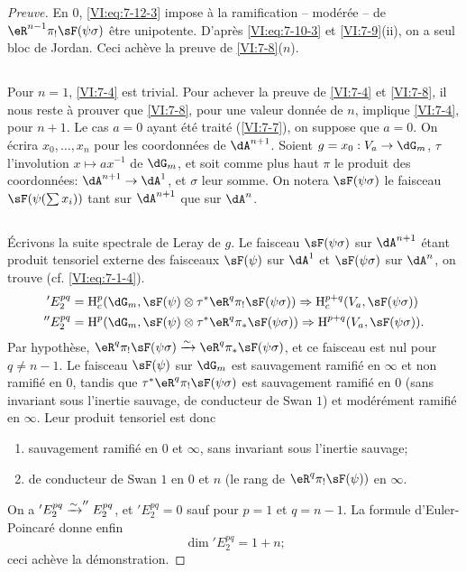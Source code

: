 \begin{proof}[Preuve]
En $0$, \eqref{VI:eq:7-12-3} impose à la ramification -- modérée -- de 
$\eR^{n-1} \pi_! \sF(\psi\sigma)$ être unipotente. D'après 
\eqref{VI:eq:7-10-3} et \ref{VI:7-9}(ii), on a seul bloc de Jordan. Ceci 
achève la preuve de \ref{VI:7-8}($n$). 





\subsection{}\label{VI:7-13}

Pour $n=1$, \ref{VI:7-4} est trivial. Pour achever la preuve de \ref{VI:7-4} et 
\ref{VI:7-8}, il nous reste à prouver que \ref{VI:7-8}, pour une valeur 
donnée de $n$, implique \ref{VI:7-4}, pour $n+1$. Le cas $a=0$ ayant été 
traité (\ref{VI:7-7}), on suppose que $a=0$. On écrira $x_0,\dots,x_n$ pour 
les coordonnées de $\dA^{n+1}$. Soient $g=x_0:V_a\to \dG_m$, $\tau$ 
l'involution $x\mapsto a x^{-1}$ de $\dG_m$, et soit comme plus haut $\pi$ le 
produit des coordonnées: $\dA^{n+1} \to \dA^1$, et $\sigma$ leur somme. On 
notera $\sF(\psi\sigma)$ le faisceau $\sF(\psi(\sum x_i))$ tant sur $\dA^{n+1}$ 
que sur $\dA^n$. 





\subsection{}\label{VI:7-14}

Écrivons la suite spectrale de Leray de $g$. Le faisceau $\sF(\psi\sigma)$ sur 
$\dA^{n+1}$ étant produit tensoriel externe des faisceaux $\sF(\psi)$ sur 
$\dA^1$ et $\sF(\psi\sigma)$ sur $\dA^n$, on trouve (cf. \eqref{VI:eq:7-1-4}). 
\begin{align*}
  'E_2^{p q} &= \h_c^p(\dG_m,\sF(\psi)\otimes \tau^\ast \eR^q \pi_! \sF(\psi\sigma)) \Rightarrow \h_c^{p+q}(V_a,\sF(\psi\sigma)) \\
  ''E_2^{p q} &= \h^p(\dG_m,\sF(\psi)\otimes \tau^\ast \eR^q \pi_\ast \sF(\psi\sigma)) \Rightarrow \h^{p+q}(V_a,\sF(\psi\sigma)) \text{.} 
\end{align*}
Par hypothèse, 
$\eR^q \pi_! \sF(\psi\sigma) \iso \eR^q \pi_\ast \sF(\psi\sigma)$, et ce 
faisceau est nul pour $q\ne n-1$. Le faisceau $\sF(\psi)$ sur $\dG_m$ est 
sauvagement ramifié en $\infty$ et non ramifié en $0$, tandis que 
$\tau^\ast \eR^q \pi_! \sF(\psi\sigma)$ est sauvagement ramifié en $0$ (sans 
invariant sous l'inertie sauvage, de conducteur de Swan $1$) et modérément 
ramifié en $\infty$. Leur produit tensoriel est donc 
\begin{enumerate}[\indent a)]
  \item sauvagement ramifié en $0$ et $\infty$, sans invariant sous l'inertie 
    sauvage; 
  \item de conducteur de Swan $1$ en $0$ et $n$ (le rang de 
    $\eR^q \pi_! \sF(\psi))$ en $\infty$. 
\end{enumerate}
On a $'E_2^{p q} \xrightarrow\sim ''E_2^{p q}$, et $'E_2^{p q}=0$ sauf pour $p=1$ et 
$q=n-1$. La formule d'Euler-Poincaré donne enfin 
\[
  \dim{'E_2^{p q}} = 1+n \text{;} 
\]
ceci achève la démonstration. 
\end{proof}

